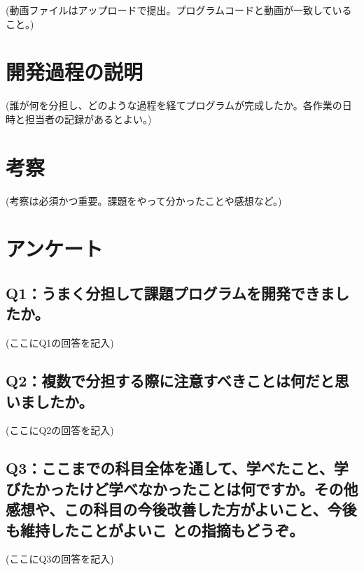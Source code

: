 \documentclass[12pt,a4j]{jarticle}
\begin{document}
(動画ファイルはアップロードで提出。プログラムコードと動画が一致していること。)

\section{開発過程の説明}

(誰が何を分担し、どのような過程を経てプログラムが完成したか。各作業の日時と担当者の記録があるとよい。)

\section{考察}

(考察は必須かつ重要。課題をやって分かったことや感想など。)

\section{アンケート}

\subsection{Q1：うまく分担して課題プログラムを開発できましたか。}

(ここにQ1の回答を記入)

\subsection{Q2：複数で分担する際に注意すべきことは何だと思いましたか。}

(ここにQ2の回答を記入)

\subsection{Q3：ここまでの科目全体を通して、学べたこと、学びたかったけど学べなかったことは何ですか。その他感想や、この科目の今後改善した方がよいこと、今後も維持したことがよいこ との指摘もどうぞ。}

(ここにQ3の回答を記入)
\end{document}
